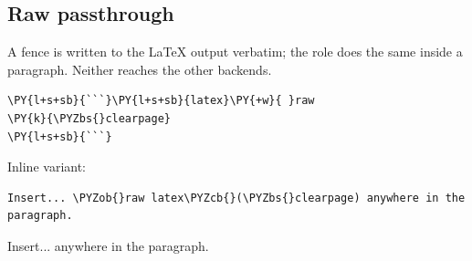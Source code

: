 \documentclass[a4paper,twoside]{article}
\begin{document}
\subsection{Raw passthrough}
A  fence is written to the \LaTeX{} output verbatim; the  role does the same inside a paragraph. Neither reaches the other backends.
\begin{tscode}[lang=md, engine=pygments]
\begin{Verbatim}[commandchars=\\\{\},breaklines, breakanywhere, commandchars=\\\{\}]
\PY{l+s+sb}{```}\PY{l+s+sb}{latex}\PY{+w}{ }raw
\PY{k}{\PYZbs{}clearpage}
\PY{l+s+sb}{```}
\end{Verbatim}
\end{tscode}
\clearpage
Inline variant:
\begin{tscode}[lang=md, engine=pygments]
\begin{Verbatim}[commandchars=\\\{\},breaklines, breakanywhere, commandchars=\\\{\}]
Insert... \PYZob{}raw latex\PYZcb{}(\PYZbs{}clearpage) anywhere in the paragraph.
\end{Verbatim}
\end{tscode}
Insert... \clearpage anywhere in the paragraph.
\end{document}
